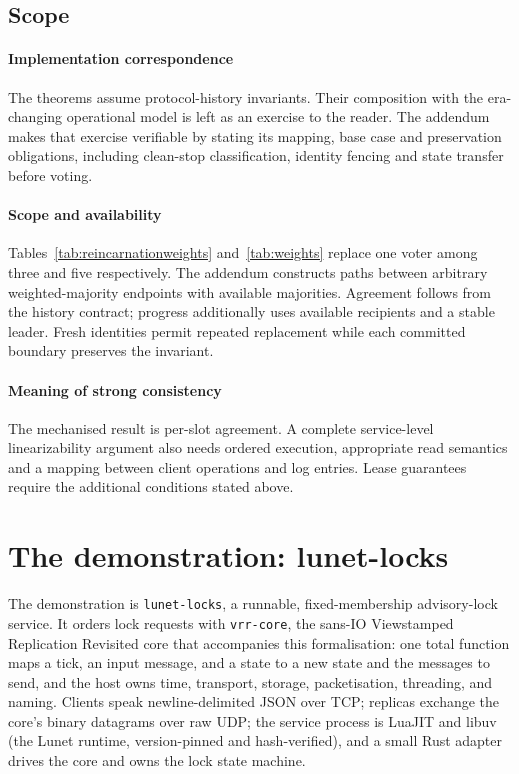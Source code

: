 \documentclass[10pt,journal,letterpaper]{IEEEtran}
\newcommand{\code}[1]{\texttt{#1}}
\begin{document}
\subsection{Scope}
\paragraph{Implementation correspondence}
The theorems assume protocol-history invariants. Their composition with the era-changing operational model is left as an exercise to the reader. The addendum~\cite{artifact} makes that exercise verifiable by stating its mapping, base case and preservation obligations, including clean-stop classification, identity fencing and state transfer before voting.

\paragraph{Scope and availability}
Tables~\ref{tab:reincarnationweights} and~\ref{tab:weights} replace one voter among three and five respectively. The addendum constructs paths between arbitrary weighted-majority endpoints with available majorities. Agreement follows from the history contract; progress additionally uses available recipients and a stable leader. Fresh identities permit repeated replacement while each committed boundary preserves the invariant.

\paragraph{Meaning of strong consistency}
The mechanised result is per-slot agreement. A complete service-level linearizability argument also needs ordered execution, appropriate read semantics and a mapping between client operations and log entries. Lease guarantees require the additional conditions stated above.

\section{The demonstration: lunet-locks}\label{sec:demo}
The demonstration is \code{lunet-locks}, a runnable, fixed-membership
advisory-lock service. It orders lock requests with \code{vrr-core}, the
sans-IO Viewstamped Replication Revisited core that accompanies this
formalisation: one total function maps a tick, an input message, and a state
to a new state and the messages to send, and the host owns time, transport,
storage, packetisation, threading, and naming. Clients speak
newline-delimited JSON over TCP; replicas exchange the core's binary
datagrams over raw UDP; the service process is LuaJIT and libuv (the Lunet
runtime, version-pinned and hash-verified), and a small Rust adapter drives
the core and owns the lock state machine.
\end{document}
